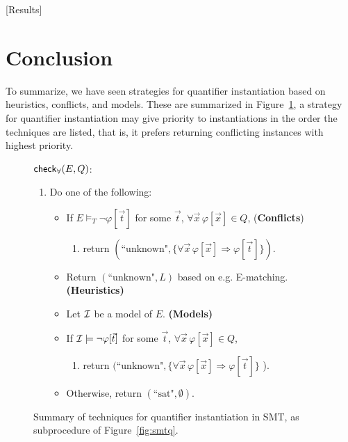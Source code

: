 \documentclass[oribibl]{llncs}
\begin{document}
[Results]

\section{Conclusion}
\label{sec:conclusion}

To summarize,
we have seen strategies for quantifier instantiation
based on heuristics, conflicts, and models.
These are summarized in Figure~\ref{fig:smtqi},
a strategy for quantifier instantiation may give priority to instantiations
in the order the techniques are listed, that is, it prefers
returning conflicting instances with highest priority.

\begin{figure}[t]
\begin{framed}
$\small\mathsf{check}_\forall( E, Q )$: \\
\begin{enumerate}
\item[\ ] Do one of the following:
\begin{itemize}
\item If $E \models_T \neg \varphi[ \vec t ]$ for some $\vec t$, $\forall \vec x\, \varphi[ \vec x ] \in Q$, \hfill ({\bf Conflicts})
\begin{enumerate}
\item[\ ] return $( \text{``unknown"}, \{ \forall \vec x\, \varphi[ \vec x ]  \Rightarrow \varphi[ \vec t ] \} )$.
\end{enumerate}
\item Return $( \text{``unknown"}, L )$ based on e.g. E-matching. \hfill {\bf(Heuristics)}
\item Let $\mathcal{I}$ be a model of $E$. \hfill {\bf(Models)}
\item[\ ] If $\mathcal{I} \models \neg \varphi[ \vec t ]$ for some $\vec t$, $\forall \vec x\, \varphi[ \vec x ] \in Q$,
\begin{enumerate}
\item[\ ] return $( \text{``unknown"}, \{ \forall \vec x\, \varphi[ \vec x ]  \Rightarrow \varphi[ \vec t ] \}$ ).
\end{enumerate}
\item[\ ] Otherwise, return $( \text{``sat"}, \emptyset )$.
\end{itemize}
\end{enumerate}
\end{framed}
\vspace{-2ex}
\caption{Summary of techniques for quantifier instantiation in SMT, as subprocedure of Figure~\ref{fig:smtq}.
\label{fig:smtqi}}
\end{figure}
\end{document}
